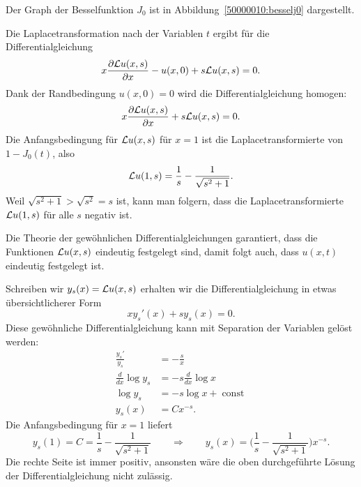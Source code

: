 \begin{loesung}
Der Graph der Besselfunktion $J_0$ ist in Abbildung~\ref{50000010:besselj0}
dargestellt.
\begin{teilaufgaben}
\item
Die Laplacetransformation nach der Variablen $t$
ergibt für die Differentialgleichung
\[
x\frac{\partial{\cal L}u(x,s)}{\partial x}
-
u(x,0)+s{\cal L}u(x,s)=0.
\]
Dank der Randbedingung $u(x,0)=0$ wird die Differentialgleichung
homogen:
\[
x\frac{\partial{\cal L}u(x,s)}{\partial x}
+
s{\cal L}u(x,s)=0.
\]
Die Anfangsbedingung für ${\cal L}u(x,s)$ für $x=1$ ist die
Laplacetransformierte von $1-J_0(t)$, also
\[
{\cal L}u(1,s)=\frac1s-\frac{1}{\sqrt{s^2+1}}.
\]
Weil $\sqrt{s^2+1}>\sqrt{s^2}=s$ ist, kann man folgern, dass
die Laplacetransformierte ${\cal L}u(1,s)$ für alle $s$ negativ ist.
\item
Die Theorie der gewöhnlichen Differentialgleichungen garantiert, dass
die Funktionen ${\cal L}u(x,s)$ eindeutig festgelegt sind, damit folgt
auch, dass $u(x,t)$ eindeutig festgelegt ist.
\item
Schreiben wir $y_s(x)={\cal L}u(x,s)$ erhalten wir die Differentialgleichung
in etwas übersichtlicherer Form
\begin{equation}
xy_s'(x)+sy_s(x)=0.
\label{50000010:sdgl}
\end{equation}
Diese gewöhnliche Differentialgleichung kann mit Separation der
Variablen gelöst werden:
\begin{align*}
\frac{y_s'}{y_s}&=-\frac{s}{x}
\\
\frac{d}{dx}\log y_s&=-s\frac{d}{dx}\log x
\\
\log y_s&=-s\log x+\operatorname{const}
\\
y_s(x)&=Cx^{-s}.
\end{align*}
Die Anfangsbedingung für $x=1$ liefert
\begin{equation}
y_s(1)=C=\frac1s-\frac{1}{\sqrt{s^2 + 1}}
\qquad\Rightarrow\qquad
y_s(x)
=
\biggl(\frac1s-\frac{1}{\sqrt{s^2+1}}\biggr)x^{-s}.
\label{50000010:loesung}
\end{equation}
Die rechte Seite ist immer positiv, ansonsten wäre die oben durchgeführte
Lösung der Differentialgleichung nicht zulässig.
\end{teilaufgaben}
\end{loesung}

